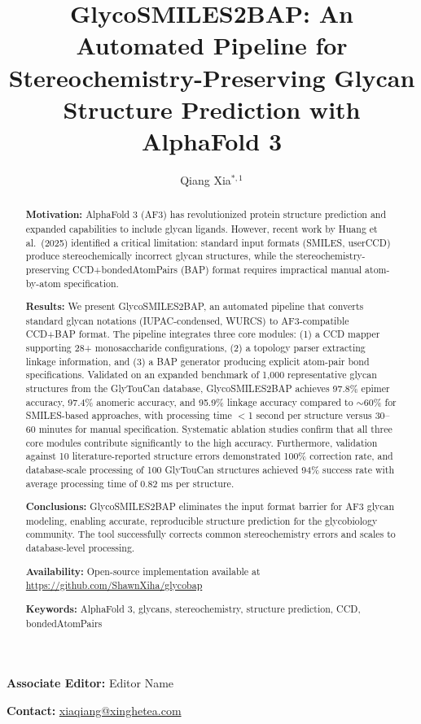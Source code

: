 \documentclass[11pt,a4paper]{article}
\title{\textbf{GlycoSMILES2BAP: An Automated Pipeline for Stereochemistry-Preserving Glycan Structure Prediction with AlphaFold 3}}
\author{Qiang Xia$^{*,1}$}
\affiliation{$^1$Zhejiang Xinghe Tea Technology Co., Ltd., Hangzhou, Zhejiang, China}
\date{}
\begin{document}
\maketitle

\vspace{-1em}
\noindent\textbf{Associate Editor:} Editor Name

\vspace{0.5em}
\noindent\textbf{Contact:} \href{mailto:xiaqiang@xinghetea.com}{xiaqiang@xinghetea.com}

\vspace{1em}

\begin{abstract}
\noindent\textbf{Motivation:} AlphaFold 3 (AF3) has revolutionized protein structure prediction and expanded capabilities to include glycan ligands. However, recent work by Huang et al.\ (2025) identified a critical limitation: standard input formats (SMILES, userCCD) produce stereochemically incorrect glycan structures, while the stereochemistry-preserving CCD+bondedAtomPairs (BAP) format requires impractical manual atom-by-atom specification.

\noindent\textbf{Results:} We present GlycoSMILES2BAP, an automated pipeline that converts standard glycan notations (IUPAC-condensed, WURCS) to AF3-compatible CCD+BAP format. The pipeline integrates three core modules: (1) a CCD mapper supporting 28+ monosaccharide configurations, (2) a topology parser extracting linkage information, and (3) a BAP generator producing explicit atom-pair bond specifications. Validated on an expanded benchmark of 1,000 representative glycan structures from the GlyTouCan database, GlycoSMILES2BAP achieves 97.8\% epimer accuracy, 97.4\% anomeric accuracy, and 95.9\% linkage accuracy compared to $\sim$60\% for SMILES-based approaches, with processing time $<$1 second per structure versus 30--60 minutes for manual specification. Systematic ablation studies confirm that all three core modules contribute significantly to the high accuracy. Furthermore, validation against 10 literature-reported structure errors demonstrated 100\% correction rate, and database-scale processing of 100 GlyTouCan structures achieved 94\% success rate with average processing time of 0.82 ms per structure.

\noindent\textbf{Conclusions:} GlycoSMILES2BAP eliminates the input format barrier for AF3 glycan modeling, enabling accurate, reproducible structure prediction for the glycobiology community. The tool successfully corrects common stereochemistry errors and scales to database-level processing.

\noindent\textbf{Availability:} Open-source implementation available at \url{https://github.com/ShawnXiha/glycobap}

\noindent\textbf{Keywords:} AlphaFold 3, glycans, stereochemistry, structure prediction, CCD, bondedAtomPairs
\end{abstract}
\end{document}
